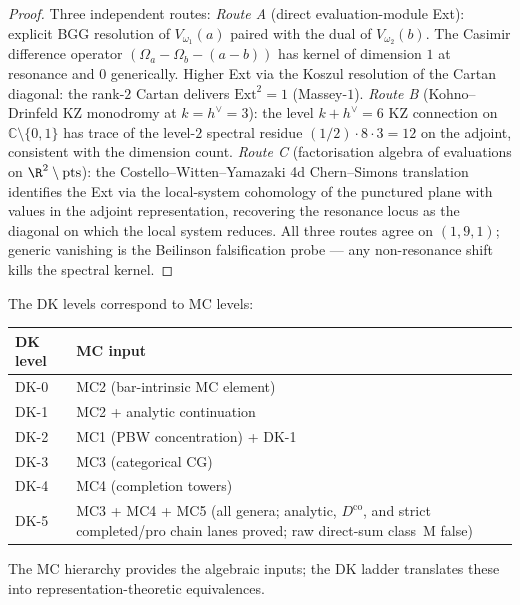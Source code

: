 \begin{proof}
Three independent routes:
\emph{Route A} (direct evaluation-module Ext): explicit BGG resolution
of $V_{\omega_1}(a)$ paired with the dual of $V_{\omega_2}(b)$. The
Casimir difference operator
$(\Omega_a - \Omega_b - (a - b))$ has kernel of dimension $1$ at
resonance and $0$ generically. Higher Ext via the Koszul resolution
of the Cartan diagonal: the rank-$2$ Cartan delivers
$\mathrm{Ext}^2 = 1$ (Massey-$1$).
\emph{Route B} (Kohno--Drinfeld KZ monodromy at $k = h^\vee = 3$):
the level $k + h^\vee = 6$ KZ connection on
$\mathbb{C} \setminus \{0, 1\}$ has trace of the level-$2$ spectral
residue $(1/2) \cdot 8 \cdot 3 = 12$ on the adjoint, consistent with
the dimension count.
\emph{Route C} (factorisation algebra of evaluations on
$\R^2 \setminus \mathrm{pts}$): the Costello--Witten--Yamazaki 4d
Chern--Simons translation identifies the Ext via the local-system
cohomology of the punctured plane with values in the adjoint
representation, recovering the resonance locus as the diagonal
on which the local system reduces.
All three routes agree on $(1, 9, 1)$; generic vanishing is the
Beilinson falsification probe — any non-resonance shift kills the
spectral kernel.
\end{proof}

\begin{remark}
The DK levels correspond to MC levels:
\begin{center}
\renewcommand{\arraystretch}{1.2}
\begin{tabular}{ll}
\textbf{DK level} & \textbf{MC input} \\
\hline
DK-0 & MC2 (bar-intrinsic MC element) \\
DK-1 & MC2 + analytic continuation \\
DK-2 & MC1 (PBW concentration) + DK-1 \\
DK-3 & MC3 (categorical CG) \\
DK-4 & MC4 (completion towers) \\
DK-5 & MC3 + MC4 + MC5 (all genera; analytic, $D^{\mathrm{co}}$, and strict completed/pro chain lanes proved; raw direct-sum class~M false)
\end{tabular}
\end{center}
The MC hierarchy provides the algebraic inputs; the DK
ladder translates these into representation-theoretic
equivalences.
\end{remark}


